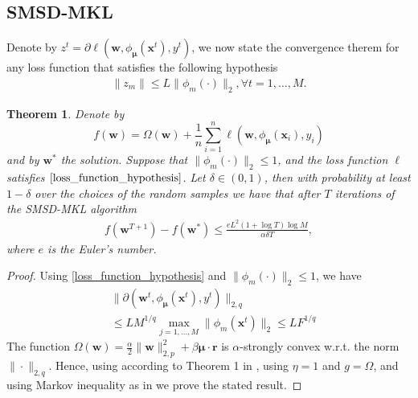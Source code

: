 \documentclass{article}
\newtheorem{theorem}{Theorem}
\begin{document}
\subsection{SMSD-MKL}
Denote by $z^t=\partial\ell(\mathbf w,\phi_{\bm \mu}(\mathbf{x}^t), y^t)$,
we now state the convergence therem for any loss function that satisfies the following hypothesis
\begin{align}
\label{loss_function_hypothesis}
    \|z_m\| \leq L\|\phi_m(\cdot)\|_2, \forall t =1,\ldots, M.
\end{align}

\begin{theorem}
Denote by $$f(\mathbf w)=\Omega(\mathbf w)+\frac{1}{n}\sum_{i=1}^n\ell(\mathbf w,\phi_{\bm \mu}(\mathbf{x}_i),y_i)$$
and by $\mathbf w^\ast$ the solution.
Suppose that $\|\phi_m(\cdot)\|_2 \leq 1$, and the loss function $\ell$ satisfies $\eqref{loss_function_hypothesis}$.
Let $\delta \in (0,1)$, then with probability at least $1 - \delta$ over the choices of the random samples
we have that after $T$ iterations of the SMSD-MKL algorithm
\begin{align*}
    f(\mathbf w^{T+1})-f(\mathbf w^\ast) \leq \frac{eL^2(1+\log T)\log M}{\alpha\delta T},
\end{align*}
where $e$ is the Euler's number.
\end{theorem}
\begin{proof}
Using \eqref{loss_function_hypothesis} and $\|\phi_m(\cdot)\|_2 \leq 1$, we have
\begin{align*}
    &\|\partial(\mathbf w^t,\phi_{\bm \mu}(\mathbf x^t), y^t)\|_{2,q} \\
    &\leq LM^{1/q} \max_{j=1, \ldots, M} \|\phi_m(\mathbf x^t)\|_2 \leq LF^{1/q}
\end{align*}
The function $\Omega(\mathbf w)=\frac{\alpha}{2}\|\mathbf w\|_{2,p}^2 + \beta\mathbf{\mu} \cdot \mathbf{r}$ is
 $\alpha$-strongly convex w.r.t. the norm $\|\cdot\|_{2,q}$. Hence, using according to Theorem 1 in \cite{Shalev-ShwartzSS07},
 using $\eta=1$ and $g=\Omega$, and using Markov inequality as in \cite{Shalev-ShwartzSS07} we prove the stated result.
\end{proof}
\end{document}
